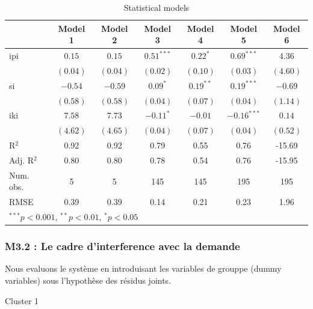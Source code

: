 \documentclass[11pt,]{article}
\begin{document}
\begin{table}[!htbp]
\begin{center}
\begin{tabular}{l c c c c c c }
\hline
 & Model 1 & Model 2 & Model 3 & Model 4 & Model 5 & Model 6 \\
\hline
ipi        & $0.15$   & $0.15$   & $0.51^{***}$ & $0.22^{*}$  & $0.69^{***}$  & $4.36$   \\
           & $(0.04)$ & $(0.04)$ & $(0.02)$     & $(0.10)$    & $(0.03)$      & $(4.60)$ \\
si         & $-0.54$  & $-0.59$  & $0.09^{*}$   & $0.19^{**}$ & $0.19^{***}$  & $-0.69$  \\
           & $(0.58)$ & $(0.58)$ & $(0.04)$     & $(0.07)$    & $(0.04)$      & $(1.14)$ \\
iki        & $7.58$   & $7.73$   & $-0.11^{*}$  & $-0.01$     & $-0.16^{***}$ & $0.14$   \\
           & $(4.62)$ & $(4.65)$ & $(0.04)$     & $(0.07)$    & $(0.04)$      & $(0.52)$ \\
\hline
R$^2$      & 0.92     & 0.92     & 0.79         & 0.55        & 0.76          & -15.69   \\
Adj. R$^2$ & 0.80     & 0.80     & 0.78         & 0.54        & 0.76          & -15.95   \\
Num. obs.  & 5        & 5        & 145          & 145         & 195           & 195      \\
RMSE       & 0.39     & 0.39     & 0.14         & 0.21        & 0.23          & 1.96     \\
\hline
\multicolumn{7}{l}{\scriptsize{$^{***}p<0.001$, $^{**}p<0.01$, $^*p<0.05$}}
\end{tabular}
\caption{Statistical models}
\label{table : ols et ivols clusters}
\end{center}
\end{table}

\FloatBarrier

\hypertarget{m3.2-le-cadre-dinterference-avec-la-demande}{%
\subsubsection{M3.2 : Le cadre d'interference avec la
demande}\label{m3.2-le-cadre-dinterference-avec-la-demande}}

Nous evaluons le système en introduisant les variables de grouppe (dummy
variables) sous l'hypothèse des résidus joints.

Cluster 1
\end{document}
